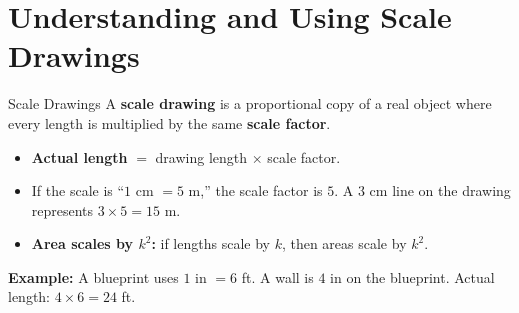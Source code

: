 \section{Understanding and Using Scale Drawings}

\begin{quickReview}{Scale Drawings}
A \textbf{scale drawing} is a proportional copy of a real object where every length is multiplied by the same \textbf{scale factor}.

\begin{itemize}[leftmargin=*]
    \item \textbf{Actual length} $=$ drawing length $\times$ scale factor.
    \item If the scale is ``$1$ cm $= 5$ m,'' the scale factor is $5$. A $3$ cm line on the drawing represents $3 \times 5 = 15$ m.
    \item \textbf{Area scales by $k^2$:} if lengths scale by $k$, then areas scale by $k^2$.
\end{itemize}

\medskip
\textbf{Example:} A blueprint uses $1$ in $= 6$ ft. A wall is $4$ in on the blueprint. Actual length: $4 \times 6 = 24$ ft.
\end{quickReview}

